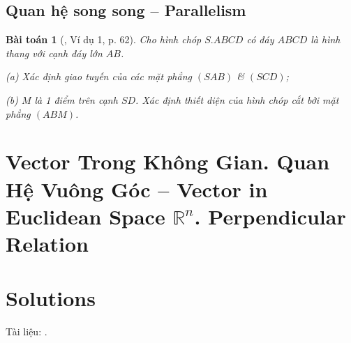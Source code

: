 \documentclass{article}
\numberwithin{equation}{section}
\newtheorem{baitoan}{Bài toán}[section]
\begin{document}

\subsection{Quan hệ song song -- Parallelism}

\begin{baitoan}[\cite{TL_chuyen_Toan_Hinh_Hoc_11}, Ví dụ 1, p. 62]
	Cho hình chóp $S.ABCD$ có đáy $ABCD$ là hình thang với cạnh đáy lớn $AB$.
	\begin{enumerate*}
		\item[(a)] Xác định giao tuyến của các mặt phẳng $(SAB)$ \& $(SCD)$;
		\item[(b)] $M$ là 1 điểm trên cạnh $SD$. Xác định thiết diện của hình chóp cắt bởi mặt phẳng $(ABM)$.
	\end{enumerate*}
\end{baitoan}


\section{Vector Trong Không Gian. Quan Hệ Vuông Góc -- Vector in Euclidean Space $\mathbb{R}^n$. Perpendicular Relation}


\section{Solutions}


Tài liệu: \cite{SGK_Toan_11_dai_so_giai_tich_co_ban, SGK_Toan_11_dai_so_giai_tich_nang_cao, SGK_Toan_11_hinh_hoc_co_ban, SGK_Toan_11_hinh_hoc_nang_cao, TL_chuyen_Toan_Dai_So_Giai_Tich_11, TL_chuyen_Toan_Hinh_Hoc_11}.

\printbibliography[heading=bibintoc]
	
\end{document}
